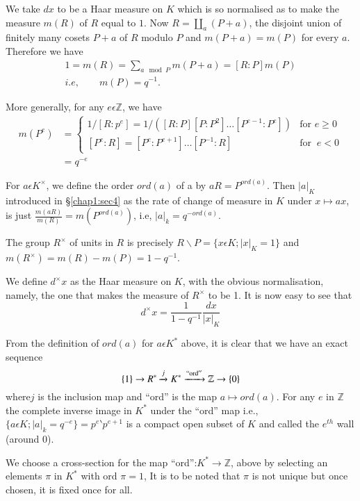  We take $dx$ to be a Haar measure on $K$ which is so normalised as to
 make the measure $m(R)$ of $R$ equal to $1$. Now
 $R={\displaystyle{\mathop{\amalg}_{a}}}(P+a)$, the disjoint union of
 finitely many cosets $P+a$ of $R$ modulo $P$ and $m(P+a)=m(P)$ for
 every $a$. Therefore we have
\begin{gather*}
1=m(R)=\sum\limits_{a \mod P}m(P+a)=[R:P]m(P)\\
i.e,\qquad m(P)=q^{-1}.
\end{gather*}

More generally, for any $e\epsilon \mathbb{Z}$, we have
\begin{align*}
m(P^{e}) & =
\begin{cases}
1/[R:p^{e}]=1/([R:P][P:P^{2}]\ldots[P^{e-1}:P^{e}])& \text{for } e\ge0\\
[P^{e}:R]=[P^{e}:P^{e+1}]\ldots[P^{-1}:R] & \text{for }~ e < 0
\end{cases}\\
& = q^{-e}
\end{align*}

For $a\epsilon K^\times$, we define the order $ord(a)$ of a by
$aR=P^{ord(a)}$. Then $|a|_{K}$ introduced in \S \ref{chap1:sec4} as the rate
of change of measure in $K$ under $x\mapsto ax$, is just
$\frac{m(aR)}{m(R)}=m(P^{ord(a)})$, i.e, $|a|_{k}=q^{-ord(a)}$.

 The group $R^\times$ of units in $R$ is precisely $R\backslash
 P=\{x\epsilon K;|x|_{K}=1\}$ and $m(R^\times)=m(R)-m(P)=1-q^{-1}$.

 We define $d^\times x$ as the Haar measure on $K$, with the obvious
 normalisation, namely, the one that makes the measure of $R^\times$ to be
 1. It is now easy to see that
\begin{equation*}
  d^\times x=\frac{1}{1-q^{-1}}\frac{dx}{|x|_{K}}
\end{equation*}

From the definition of $ord(a)$ for $a\epsilon K^*$ above, it is clear
that we have an exact sequence
$$
\{1\}\to
R^{\ast}\xrightarrow{j}K^{\ast}\xrightarrow{``\text{ord}''}\mathbb{Z}\to \{0\}
$$
where\pageoriginale $j$ is the inclusion map and ``ord'' is the map $a\mapsto
ord(a)$. For any $e$ in $\mathbb{Z}$ the complete inverse image in
$K^*$ under the ``ord'' map i.e., $\{a\epsilon
K;|a|_{k}=q^{-e}\}=p^{e} \backprime p^{e+1}$ is a compact open subset of $K$ and
called the $e^{th}$ wall (around 0).

 We choose a  cross-section for the map ``ord'':$K^{\ast}\rightarrow
 \mathbb{Z}$, above by selecting an elements $\pi$ in $K^{\ast}$ with
 ord $\pi=1$, It is to be noted that $\pi$ is not unique but once
 chosen, it is fixed once for all.

